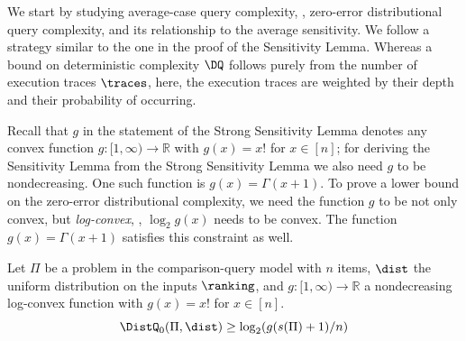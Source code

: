 \documentclass{toc}
\begin{document}
We start by studying average-case query complexity, \ie, zero-error distributional query complexity, and its relationship to the average sensitivity. We follow a strategy similar to the one in the proof of the Sensitivity Lemma. Whereas a bound on deterministic complexity $\DQ$ follows purely from the number of execution traces $\traces$, here, the execution traces are weighted by their depth and their probability of occurring.

Recall that $g$ in the statement of the Strong Sensitivity Lemma denotes any convex function $g: [1,\infty) \to \mathbb{R}$ with $g(x) = x!$ for $x \in [n]$; for deriving the Sensitivity Lemma from the Strong Sensitivity Lemma we also need $g$ to be nondecreasing. One such function is $g(x) = \Gamma(x+1)$. To prove a lower bound on the zero-error distributional complexity, we need the function $g$ to be not only convex, but \emph{log-convex}, \ie, $\log_2 g(x)$ needs to be convex. The function $g(x) = \Gamma(x+1)$ satisfies this constraint as well.

\begin{proposition}
	\label{claim:sensitivity:average}
Let $\Pi$ be a problem in the comparison-query model with $n$ items, $\dist$ the uniform distribution on the inputs $\ranking$, and $g: [1,\infty) \to \mathbb{R}$ a nondecreasing log-convex function with $g(x) = x!$ for $x \in [n]$.
\[\DistQ_0(\Pi,\dist)\ge \log_2 (g(s(\Pi)+1)/n) \]
\end{proposition}
\end{document}
